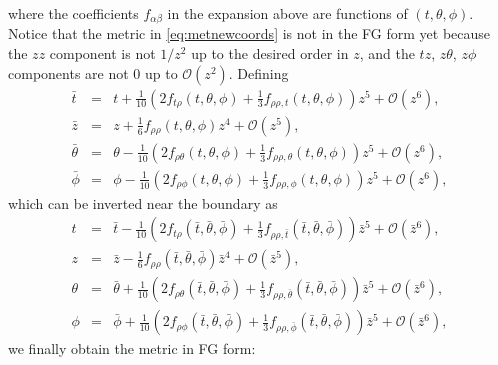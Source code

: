 \documentclass[a4paper,11pt]{article}
\numberwithin{equation}{section}
\begin{document}
where the coefficients $f_{\alpha\beta}$ in the expansion above are functions of $(t,\theta,\phi)$.  
Notice that the metric in \eqref{eq:metnewcoords} is not in the FG form  yet because the $zz$ component is not $1/z^2$ up to the desired order in $z$, and the $tz$, $z\theta$, $z\phi$ components are not 0 up to $\mathcal{O}(z^2)$.
Defining 
\begin{eqnarray}
\label{eqn:FGcoords}
\bar{t}&=&t+\frac{1}{10 } \left(2 f_{t\rho}(t,\theta,\phi)+\frac{1}{3}f_{\rho\rho,t}(t,\theta,\phi)\right)z^5+\mathcal{O}(z^6),\\
\bar{z}&=&z+\frac{1}{6}f_{\rho\rho}(t,\theta,\phi)z^4+\mathcal{O}(z^5),\\
\bar{\theta}&=&\theta-\frac{1}{10} \left(2 f_{\rho\theta}(t,\theta,\phi)+\frac{1}{3}f_{\rho\rho,\theta}(t,\theta,\phi)\right)z^5+\mathcal{O}(z^6),\\
\bar{\phi}&=&\phi-\frac{1}{10} \left(2 f_{\rho\phi}(t,\theta,\phi)+\frac{1}{3}f_{\rho\rho,\phi}(t,\theta,\phi)\right)z^5+\mathcal{O}(z^6),
\end{eqnarray}
which can be inverted near the boundary as
\begin{eqnarray}
\label{eqn:invertFGcoords}
t&=&\bar{t}-\frac{1}{10} \left(2 f_{t\rho}(\bar{t},\bar{\theta},\bar{\phi})+\frac{1}{3}f_{\rho\rho,\bar{t}}(\bar{t},\bar{\theta},\bar{\phi})\right)\bar{z}^5+\mathcal{O}(\bar{z}^6),\\
z&=&\bar{z}-\frac{1}{6}f_{\rho\rho}(\bar{t},\bar{\theta},\bar{\phi})\bar{z}^4+\mathcal{O}(\bar{z}^5),\\
\theta&=&\bar{\theta}+\frac{1}{10} \left(2 f_{\rho\theta}(\bar{t},\bar{\theta},\bar{\phi})+\frac{1}{3}f_{\rho\rho,\bar{\theta}}(\bar{t},\bar{\theta},\bar{\phi})\right)\bar{z}^5+\mathcal{O}(\bar{z}^6),\\
\phi&=&\bar{\phi}+\frac{1}{10} \left(2 f_{\rho\phi}(\bar{t},\bar{\theta},\bar{\phi})+\frac{1}{3}f_{\rho\rho,\bar{\phi}}(\bar{t},\bar{\theta},\bar{\phi})\right)\bar{z}^5+\mathcal{O}(\bar{z}^6),
\end{eqnarray}
we finally obtain the metric in FG form:%
\end{document}
